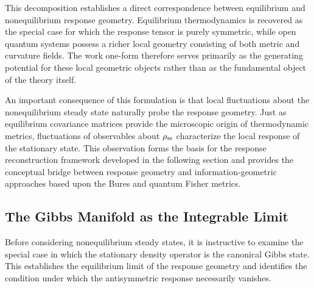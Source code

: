 This decomposition establishes a direct correspondence between
equilibrium and nonequilibrium response geometry. Equilibrium
thermodynamics is recovered as the special case for which the
response tensor is purely symmetric, while open quantum systems
possess a richer local geometry consisting of both metric and
curvature fields. The work one-form therefore serves primarily
as the generating potential for these local geometric objects
rather than as the fundamental object of the theory itself.

An important consequence of this formulation is that local
fluctuations about the nonequilibrium steady state naturally
probe the response geometry. Just as equilibrium covariance
matrices provide the microscopic origin of thermodynamic
metrics, fluctuations of observables about
\(\rho_{\rm ss}\) characterize the local response of the
stationary state. This observation forms the basis for the
response reconstruction framework developed in the following
section and provides the conceptual bridge between response
geometry and information-geometric approaches based upon the
Bures and quantum Fisher metrics.


\subsection{The Gibbs Manifold as the Integrable Limit}
Before considering nonequilibrium steady states, it is
instructive to examine the special case in which the
stationary density operator is the canonical Gibbs state.
This establishes the equilibrium limit of the response
geometry and identifies the condition under which the
antisymmetric response necessarily vanishes.

